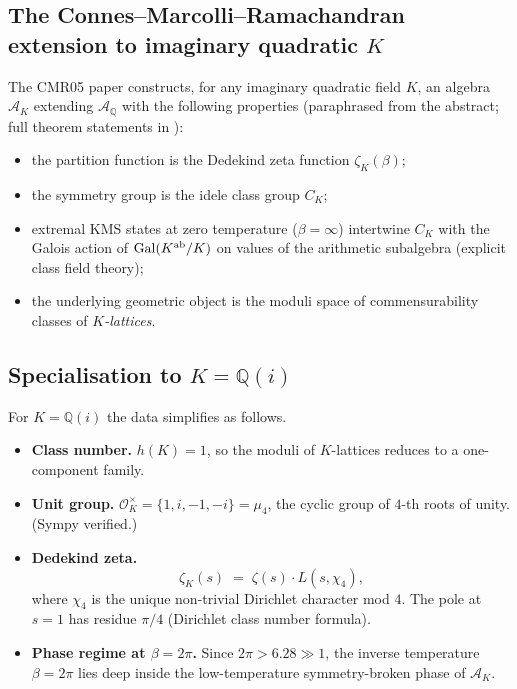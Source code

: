 \documentclass[12pt]{amsart}
\theoremstyle{definition}
\newcommand{\Q}{\mathbb{Q}}
\newcommand{\OK}{\mathcal{O}_K}
\newcommand{\Gal}{\mathrm{Gal}}
\begin{document}
\subsection{The Connes--Marcolli--Ramachandran extension to
            imaginary quadratic $K$}
The CMR05 paper \cite{CMR05} constructs, for any imaginary
quadratic field $K$, an algebra $\mathcal{A}_K$ extending
$\mathcal{A}_\Q$ with the following properties (paraphrased from
the abstract; full theorem statements in \cite[\S 1, \S 4]{CMR05}):
\begin{itemize}
\item the partition function is the Dedekind zeta function
  $\zeta_K(\beta)$;
\item the symmetry group is the idele class group $C_K$;
\item extremal KMS states at zero temperature ($\beta = \infty$)
  intertwine $C_K$ with the Galois action of
  $\Gal(K^{\rm ab}/K)$ on values of the arithmetic subalgebra
  (explicit class field theory);
\item the underlying geometric object is the moduli space of
  commensurability classes of \emph{$K$-lattices}.
\end{itemize}

\subsection{Specialisation to $K = \Q(i)$}
For $K = \Q(i)$ the data simplifies as follows.
\begin{itemize}
\item \textbf{Class number.} $h(K) = 1$, so the moduli of
  $K$-lattices reduces to a one-component family.
\item \textbf{Unit group.} $\OK^\times = \{1, i, -1, -i\} = \mu_4$,
  the cyclic group of $4$-th roots of unity. (Sympy verified.)
\item \textbf{Dedekind zeta.}
  \[
    \zeta_K(s) \;=\; \zeta(s) \cdot L(s, \chi_4),
  \]
  where $\chi_4$ is the unique non-trivial Dirichlet character mod
  $4$. The pole at $s=1$ has residue $\pi/4$ (Dirichlet class
  number formula).
\item \textbf{Phase regime at $\beta = 2\pi$.} Since $2\pi >
  6.28 \gg 1$, the inverse temperature $\beta = 2\pi$ lies deep
  inside the low-temperature symmetry-broken phase of
  $\mathcal{A}_K$.
\end{itemize}
\end{document}
